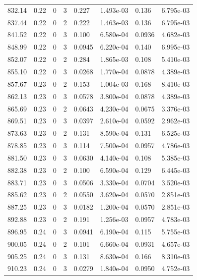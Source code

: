 \documentclass[preview]{standalone}
\begin{document}
{{{{{{{{{{{{\begin{tabular}{L{1.2cm}C{1.2cm} C{0.3cm}C{0.5cm} C{1.4cm}C{1.4cm} C{1.4cm}C{1.4cm}}
  832.14  &  0.22  & 0     &  3 &  0.227  & 1.493e-03  & 0.136 &  6.795e-03   \\ 
  837.44  &  0.22  & 0     &  2 &  0.222  & 1.463e-03  & 0.136 &  6.795e-03   \\ 
  841.52  &  0.22  & 0     &  3 &  0.100  & 6.580e-04  & 0.0936 &  4.682e-03   \\ 
  848.99  &  0.22  & 0     &  3 &  0.0945  & 6.220e-04  & 0.140 &  6.995e-03   \\ 
  852.07  &  0.22  & 0     &  2 &  0.284  & 1.865e-03  & 0.108 &  5.410e-03   \\ 
  855.10  &  0.22  & 0     &  3 &  0.0268  & 1.770e-04  & 0.0878 &  4.389e-03   \\ 
  857.67  &  0.23  & 0     &  2 &  0.153  & 1.004e-03  & 0.168 &  8.410e-03   \\ 
  862.13  &  0.23  & 0     &  3 &  0.0578  & 3.800e-04  & 0.0878 &  4.389e-03   \\ 
  865.69  &  0.23  & 0     &  2 &  0.0643  & 4.230e-04  & 0.0675 &  3.376e-03   \\ 
  869.51  &  0.23  & 0     &  3 &  0.0397  & 2.610e-04  & 0.0592 &  2.962e-03   \\ 
  873.63  &  0.23  & 0     &  2 &  0.131  & 8.590e-04  & 0.131 &  6.525e-03   \\ 
  878.85  &  0.23  & 0     &  3 &  0.114  & 7.500e-04  & 0.0957 &  4.786e-03   \\ 
  881.50  &  0.23  & 0     &  3 &  0.0630  & 4.140e-04  & 0.108 &  5.385e-03   \\ 
  882.38  &  0.23  & 0     &  2 &  0.100  & 6.590e-04  & 0.129 &  6.445e-03   \\ 
  883.71  &  0.23  & 0     &  3 &  0.0506  & 3.330e-04  & 0.0704 &  3.520e-03   \\ 
  885.62  &  0.23  & 0     &  2 &  0.0550  & 3.620e-04  & 0.0570 &  2.851e-03   \\ 
  887.25  &  0.23  & 0     &  3 &  0.0182  & 1.200e-04  & 0.0570 &  2.851e-03   \\ 
  892.88  &  0.23  & 0     &  2 &  0.191  & 1.256e-03  & 0.0957 &  4.783e-03   \\ 
  896.95  &  0.24  & 0     &  3 &  0.0941  & 6.190e-04  & 0.115 &  5.755e-03   \\ 
  900.05  &  0.24  & 0     &  2 &  0.101  & 6.660e-04  & 0.0931 &  4.657e-03   \\ 
  905.25  &  0.24  & 0     &  3 &  0.131  & 8.630e-04  & 0.166 &  8.310e-03   \\ 
  910.23  &  0.24  & 0     &  3 &  0.0279  & 1.840e-04  & 0.0950 &  4.752e-03   \\ 

\end{tabular}}}}}}}}}}}}}
\end{document}
